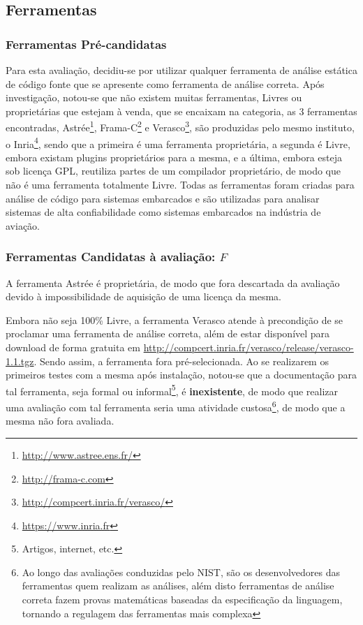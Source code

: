 \subsection{Ferramentas}

\subsubsection{Ferramentas Pré-candidatas}

Para esta avaliação, decidiu-se por utilizar qualquer ferramenta de análise estática de código fonte que se apresente como ferramenta de análise correta. Após investigação, notou-se que não existem muitas ferramentas, Livres ou proprietárias que estejam à venda, que se encaixam na categoria, as 3 ferramentas encontradas, Astrée\footnote{\url{http://www.astree.ens.fr/}}, Frama-C\footnote{\url{http://frama-c.com}} e Verasco\footnote{\url{http://compcert.inria.fr/verasco/}}, são produzidas pelo mesmo instituto, o Inria\footnote{\url{https://www.inria.fr}}, sendo que a primeira é uma ferramenta proprietária, a segunda é Livre, embora existam plugins proprietários para a mesma, e a última, embora esteja sob licença GPL, reutiliza partes de um compilador proprietário, de modo que não é uma ferramenta totalmente Livre. Todas as ferramentas foram criadas para análise de código para sistemas embarcados e são utilizadas para analisar sistemas de alta confiabilidade como sistemas embarcados na indústria de aviação.

\subsubsection{Ferramentas Candidatas à avaliação: $F$}

A ferramenta Astrée é proprietária, de modo que fora descartada da avaliação devido à impossibilidade de aquisição de uma licença da mesma.

Embora não seja 100\% Livre, a ferramenta Verasco atende à precondição de se proclamar uma ferramenta de análise correta, além de estar disponível para download de forma gratuita em \url{http://compcert.inria.fr/verasco/release/verasco-1.1.tgz}. Sendo assim, a ferramenta fora pré-selecionada. Ao se realizarem os primeiros testes com a mesma após instalação, notou-se que a documentação para tal ferramenta, seja formal ou informal\footnote{Artigos, internet, etc.}, é \textbf{inexistente}, de modo que realizar uma avaliação com tal ferramenta seria uma atividade custosa\footnote{Ao longo das avaliações conduzidas pelo NIST, são os desenvolvedores das ferramentas quem realizam as análises, além disto ferramentas de análise correta fazem provas matemáticas baseadas da especificação da linguagem, tornando a regulagem das ferramentas mais complexa}, de modo que a mesma não fora avaliada.

